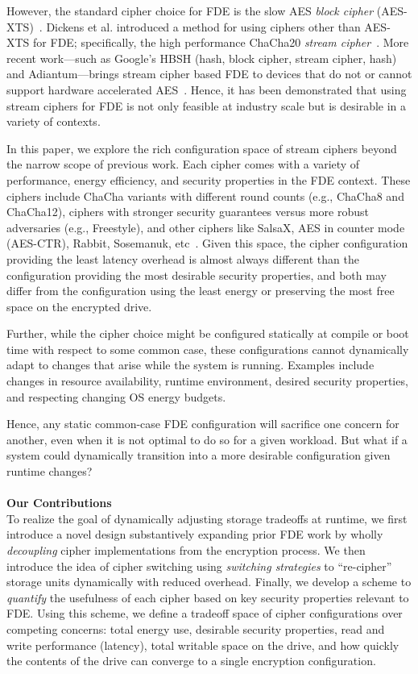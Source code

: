 However, the standard cipher choice for FDE is the slow AES \emph{block cipher}
(AES-XTS)~\cite{XTS, XTSComments, NISTXTS}. Dickens et al. introduced a method
for using ciphers other than AES-XTS for FDE; specifically, the high performance
ChaCha20 \emph{stream cipher}~\cite{StrongBox, ChaCha20}. More recent
work---such as Google's HBSH (hash, block cipher, stream cipher, hash) and
Adiantum---brings stream cipher based FDE to devices that do not or cannot
support hardware accelerated AES~\cite{Adiantum}. Hence, it has been
demonstrated that using stream ciphers for FDE is not only feasible at industry
scale but is desirable in a variety of contexts.

In this paper, we explore the rich configuration space of stream ciphers beyond
the narrow scope of previous work. Each cipher comes with a variety of
performance, energy efficiency, and security properties in the FDE context.
These ciphers include ChaCha variants with different round counts (e.g., ChaCha8
and ChaCha12), ciphers with stronger security guarantees versus more robust
adversaries (e.g., Freestyle), and other ciphers like SalsaX, AES in counter
mode (AES-CTR), Rabbit, Sosemanuk, etc~\cite{Freestyle, SalsaX, Rabbit,
Sosemanuk, ChaCha20, AESCTR}. Given this space, the cipher configuration
providing the least latency overhead is almost always different than the
configuration providing the most desirable security properties, and both may
differ from the configuration using the least energy or preserving the most free
space on the encrypted drive.

Further, while the cipher choice might be configured statically at compile or
boot time with respect to some common case, these configurations cannot
dynamically adapt to changes that arise while the system is running. Examples
include changes in resource availability, runtime environment, desired security
properties, and respecting changing OS energy budgets.

Hence, any static common-case FDE configuration will sacrifice one concern for
another, even when it is not optimal to do so for a given workload. But what if
a system could dynamically transition into a more desirable configuration given
runtime changes?\\
\\
\textbf{Our Contributions}\\
To realize the goal of dynamically adjusting storage tradeoffs at runtime, we
first introduce a novel design substantively expanding prior FDE work by wholly
\emph{decoupling} cipher implementations from the encryption process. We then
introduce the idea of cipher switching using \emph{switching strategies} to
``re-cipher'' storage units dynamically with reduced overhead. Finally, we
develop a scheme to \emph{quantify} the usefulness of each cipher based on key
security properties relevant to FDE. Using this scheme, we define a tradeoff
space of cipher configurations over competing concerns: total energy use,
desirable security properties, read and write performance (latency), total
writable space on the drive, and how quickly the contents of the drive can
converge to a single encryption configuration.

